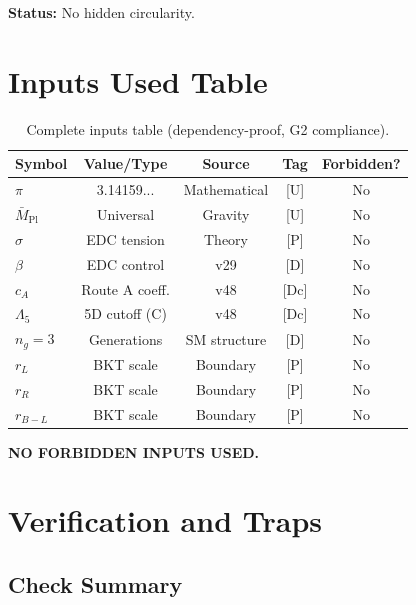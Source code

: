 \documentclass[11pt,a4paper]{article}
\begin{document}
\textbf{Status:} No hidden circularity.

\section{Inputs Used Table}
\label{sec:inputs-table}

\begin{table}[ht]
\centering
\caption{Complete inputs table (dependency-proof, G2 compliance).}
\label{tab:inputs-full}
\begin{tabular}{lcccc}
\toprule
Symbol & Value/Type & Source & Tag & Forbidden? \\
\midrule
$\pi$ & 3.14159... & Mathematical & [U] & No \\
$\bar{M}_{\text{Pl}}$ & Universal & Gravity & [U] & No \\
$\sigma$ & EDC tension & Theory & [P] & No \\
$\beta$ & EDC control & v29 & [D] & No \\
$c_A$ & Route A coeff. & v48 & [Dc] & No \\
$\Lambda_5$ & 5D cutoff (C) & v48 & [Dc] & No \\
$n_g = 3$ & Generations & SM structure & [D] & No \\
$r_L$ & BKT scale & Boundary & [P] & No \\
$r_R$ & BKT scale & Boundary & [P] & No \\
$r_{B-L}$ & BKT scale & Boundary & [P] & No \\
\bottomrule
\end{tabular}
\end{table}

\textbf{NO FORBIDDEN INPUTS USED.}

\section{Verification and Traps}
\label{sec:traps}

\subsection{Check Summary}
\label{subsec:check-summary}
\end{document}
